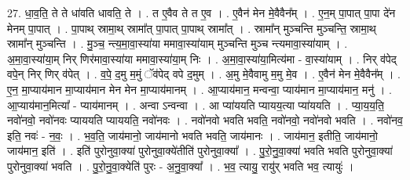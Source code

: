 \documentclass[17pt]{extarticle}
\begin{document}
27. धा॒व॒ति॒ ते ते धा॑वति धावति॒ ते । . त ए॒वैव ते त ए॒व । . ए॒वैन॑ मेन मे॒वैवैन᳚म् । . ए॒न॒म् पा॒पात् पा॒पा दे॑न मेनम् पा॒पात् । . पा॒पाथ् स्रामा॒थ् स्रामा᳚त् पा॒पात् पा॒पाथ् स्रामा᳚त् । . स्रामा᳚न् मुञ्चन्ति मुञ्चन्ति॒ स्रामा॒थ् स्रामा᳚न् मुञ्चन्ति । . मु॒ञ्च॒ न्त्य॒मा॒वा॒स्या॑या ममावा॒स्या॑याम् मुञ्चन्ति मुञ्च न्त्यमावा॒स्या॑याम् । . अ॒मा॒वा॒स्या॑या॒म् निर् णिर॑मावा॒स्या॑या ममावा॒स्या॑या॒म् निः । . अ॒मा॒वा॒स्या॑या॒मित्य॑मा - वा॒स्या॑याम् । . निर् व॑पेद् वपे॒न् निर् णिर् व॑पेत् । . व॒पे॒ द॒मु म॒मुं ॅव॑पेद् वपे द॒मुम् । . अ॒मु मे॒वैवामु म॒मु मे॒व । . ए॒वैन॑ मेन मे॒वैवैन᳚म् । . ए॒न॒ मा॒प्याय॑मान मा॒प्याय॑मान मेन मेन मा॒प्याय॑मानम् । . आ॒प्याय॑मान॒ मन्वन्वा॒ प्याय॑मान मा॒प्याय॑मान॒ मनु॑ । . आ॒प्याय॑मान॒मित्या᳚ - प्याय॑मानम् । . अन्वा ऽन्वन्वा । . आ प्या॑ययति प्यायय॒त्या प्या॑ययति । . प्या॒य॒य॒ति॒ नवो॑नवो॒ नवो॑नवः प्याययति प्याययति॒ नवो॑नवः । . नवो॑नवो भवति भवति॒ नवो॑नवो॒ नवो॑नवो भवति । . नवो॑नव॒ इति॒ नवः॑ - न॒वः॒ । . भ॒व॒ति॒ जाय॑मानो॒ जाय॑मानो भवति भवति॒ जाय॑मानः । . जाय॑मान॒ इतीति॒ जाय॑मानो॒ जाय॑मान॒ इति॑ । . इति॑ पुरोनुवा॒क्या॑ पुरोनुवा॒क्ये॑तीति॑ पुरोनुवा॒क्या᳚ । . पु॒रो॒नु॒वा॒क्या॑ भवति भवति पुरोनुवा॒क्या॑ पुरोनुवा॒क्या॑ भवति । . पु॒रो॒नु॒वा॒क्येति॑ पुरः - अ॒नु॒वा॒क्या᳚ । . भ॒व॒ त्यायु॒ रायु॑र् भवति भव॒ त्यायुः॑ । \newline
\end{document}
